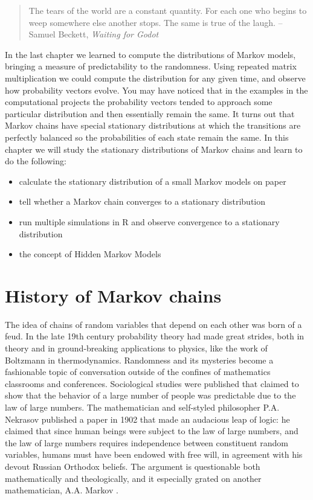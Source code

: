 \documentclass[
  letterpaper,
  DIV=11,
  numbers=noendperiod]{scrreprt}
\providecommand{\tightlist}{%
  \setlength{\itemsep}{0pt}\setlength{\parskip}{0pt}}\usepackage{longtable,booktabs,array}
\begin{document}
\begin{quote}
The tears of the world are a constant quantity. For each one who begins
to weep somewhere else another stops. The same is true of the laugh. --
Samuel Beckett, \emph{Waiting for Godot}
\end{quote}

In the last chapter we learned to compute the distributions of Markov
models, bringing a measure of predictability to the randomness. Using
repeated matrix multiplication we could compute the distribution for any
given time, and observe how probability vectors evolve. You may have
noticed that in the examples in the computational projects the
probability vectors tended to approach some particular distribution and
then essentially remain the same. It turns out that Markov chains have
special stationary distributions at which the transitions are perfectly
balanced so the probabilities of each state remain the same. In this
chapter we will study the stationary distributions of Markov chains and
learn to do the following:

\begin{itemize}
\tightlist
\item
  calculate the stationary distribution of a small Markov models on
  paper
\item
  tell whether a Markov chain converges to a stationary distribution
\item
  run multiple simulations in R and observe convergence to a stationary
  distribution
\item
  the concept of Hidden Markov Models
\end{itemize}

\hypertarget{history-of-markov-chains}{%
\section{History of Markov chains}\label{history-of-markov-chains}}

The idea of chains of random variables that depend on each other was
born of a feud. In the late 19th century probability theory had made
great strides, both in theory and in ground-breaking applications to
physics, like the work of Boltzmann in thermodynamics. Randomness and
its mysteries become a fashionable topic of conversation outside of the
confines of mathematics classrooms and conferences. Sociological studies
were published that claimed to show that the behavior of a large number
of people was predictable due to the law of large numbers. The
mathematician and self-styled philosopher P.A. Nekrasov published a
paper in 1902 that made an audacious leap of logic: he claimed that
since human beings were subject to the law of large numbers, and the law
of large numbers requires independence between constituent random
variables, humans must have been endowed with free will, in agreement
with his devout Russian Orthodox beliefs. The argument is questionable
both mathematically and theologically, and it especially grated on
another mathematician, A.A. Markov \cite{hayes_first_2012}.
\end{document}
